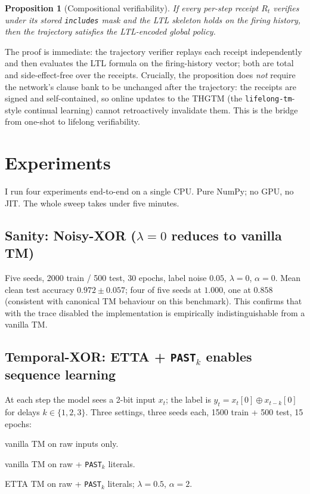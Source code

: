 \documentclass[11pt]{article}
\newtheorem{proposition}{Proposition}
\begin{document}
\begin{proposition}[Compositional verifiability]
\label{prop:composition}
If every per-step receipt $R_t$ verifies under its stored \texttt{includes} mask and the LTL skeleton holds on the firing history, then the trajectory satisfies the LTL-encoded global policy.
\end{proposition}
The proof is immediate: the trajectory verifier replays each receipt independently and then evaluates the LTL formula on the firing-history vector; both are total and side-effect-free over the receipts.  Crucially, the proposition does \emph{not} require the network's clause bank to be unchanged after the trajectory: the receipts are signed and self-contained, so online updates to the THGTM (the \texttt{lifelong-tm}-style continual learning) cannot retroactively invalidate them.  This is the bridge from one-shot to lifelong verifiability.

\section{Experiments}

I run four experiments end-to-end on a single CPU.  Pure NumPy; no GPU, no JIT.  The whole sweep takes under five minutes.

\subsection{Sanity: Noisy-XOR ($\lambda = 0$ reduces to vanilla TM)}

Five seeds, 2000 train / 500 test, 30 epochs, label noise $0.05$, $\lambda = 0$, $\alpha = 0$.  Mean clean test accuracy $0.972 \pm 0.057$; four of five seeds at $1.000$, one at $0.858$ (consistent with canonical TM behaviour on this benchmark).  This confirms that with the trace disabled the implementation is empirically indistinguishable from a vanilla TM.

\subsection{Temporal-XOR: ETTA + \texttt{PAST}$_k$ enables sequence learning}

At each step the model sees a 2-bit input $x_t$; the label is $y_t = x_t[0] \oplus x_{t-k}[0]$ for delays $k \in \{1, 2, 3\}$.  Three settings, three seeds each, 1500 train + 500 test, 15 epochs:
\begin{description}[leftmargin=2em]
\item[$M_\text{raw}$:] vanilla TM on raw inputs only.
\item[$M_\text{past-only}$:] vanilla TM on raw + \texttt{PAST}$_k$ literals.
\item[$M_\text{past-etta}$:] ETTA TM on raw + \texttt{PAST}$_k$ literals; $\lambda = 0.5$, $\alpha = 2$.
\end{description}
\end{document}
